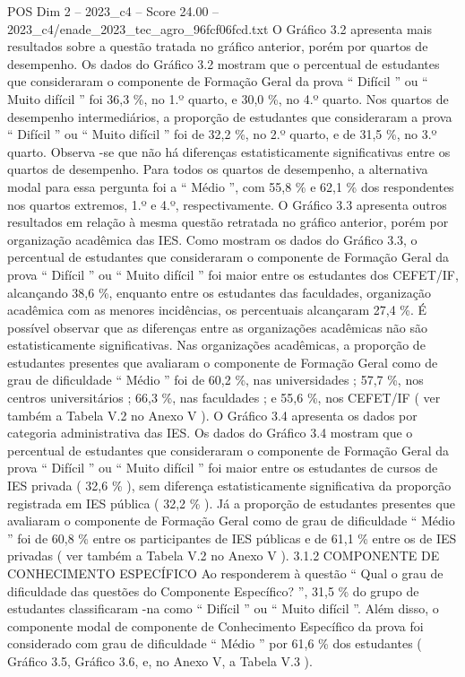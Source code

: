 \begin{textsample}{POS Dim 2 – 2023\_c4 – Score 24.00 – 2023\_c4/enade\_2023\_tec\_agro\_96fcf06fcd.txt}
O Gráfico 3.2 apresenta mais resultados sobre a questão tratada no gráfico anterior, porém por quartos de desempenho.
Os dados do Gráfico 3.2 mostram que o percentual de estudantes que consideraram o componente de Formação Geral da prova “ Difícil ” ou “ Muito difícil ” foi 36,3 \%, no 1.º quarto, e 30,0 \%, no 4.º quarto.
Nos quartos de desempenho intermediários, a proporção de estudantes que consideraram a prova “ Difícil ” ou “ Muito difícil ” foi de 32,2 \%, no 2.º quarto, e de 31,5 \%, no 3.º quarto.
Observa -se que não há diferenças estatisticamente significativas entre os quartos de desempenho.
Para todos os quartos de desempenho, a alternativa modal para essa pergunta foi a “ Médio ”, com 55,8 \% e 62,1 \% dos respondentes nos quartos extremos, 1.º e 4.º, respectivamente.
O Gráfico 3.3 apresenta outros resultados em relação à mesma questão retratada no gráfico anterior, porém por organização acadêmica das IES.
Como mostram os dados do Gráfico 3.3, o percentual de estudantes que consideraram o componente de Formação Geral da prova “ Difícil ” ou “ Muito difícil ” foi maior entre os estudantes dos CEFET/IF, alcançando 38,6 \%, enquanto entre os estudantes das faculdades, organização acadêmica com as menores incidências, os percentuais alcançaram 27,4 \%.
É possível observar que as diferenças entre as organizações acadêmicas não são estatisticamente significativas.
Nas organizações acadêmicas, a proporção de estudantes presentes que avaliaram o componente de Formação Geral como de grau de dificuldade “ Médio ” foi de 60,2 \%, nas universidades ; 57,7 \%, nos centros universitários ; 66,3 \%, nas faculdades ; e 55,6 \%, nos CEFET/IF ( ver também a Tabela V.2 no Anexo V ).
O Gráfico 3.4 apresenta os dados por categoria administrativa das IES.
Os dados do Gráfico 3.4 mostram que o percentual de estudantes que consideraram o componente de Formação Geral da prova “ Difícil ” ou “ Muito difícil ” foi maior entre os estudantes de cursos de IES privada ( 32,6 \% ), sem diferença estatisticamente significativa da proporção registrada em IES pública ( 32,2 \% ).
Já a proporção de estudantes presentes que avaliaram o componente de Formação Geral como de grau de dificuldade “ Médio ” foi de 60,8 \% entre os participantes de IES públicas e de 61,1 \% entre os de IES privadas ( ver também a Tabela V.2 no Anexo V ). 3.1.2 COMPONENTE DE CONHECIMENTO ESPECÍFICO Ao responderem à questão “ Qual o grau de dificuldade das questões do Componente Específico? ”, 31,5 \% do grupo de estudantes classificaram -na como “ Difícil ” ou “ Muito difícil ”.
Além disso, o componente modal de componente de Conhecimento Específico da prova foi considerado com grau de dificuldade “ Médio ” por 61,6 \% dos estudantes ( Gráfico 3.5, Gráfico 3.6, e, no Anexo V, a Tabela V.3 ).

\end{textsample}
